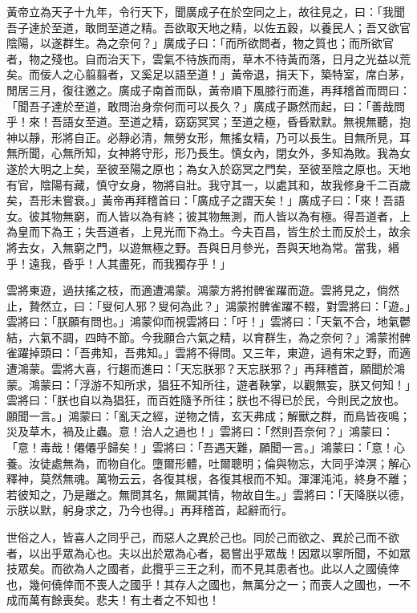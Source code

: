 \begin{pinyinscope}
黃帝立為天子十九年，令行天下，聞廣成子在於空同之上，故往見之，曰：「我聞吾子達於至道，敢問至道之精。吾欲取天地之精，以佐五穀，以養民人；吾又欲官陰陽，以遂群生。為之奈何？」廣成子曰：「而所欲問者，物之質也；而所欲官者，物之殘也。自而治天下，雲氣不待族而雨，草木不待黃而落，日月之光益以荒矣。而佞人之心翦翦者，又奚足以語至道！」黃帝退，捐天下，築特室，席白茅，閒居三月，復往邀之。廣成子南首而臥，黃帝順下風膝行而進，再拜稽首而問曰：「聞吾子達於至道，敢問治身奈何而可以長久？」廣成子蹶然而起，曰：「善哉問乎！來！吾語女至道。至道之精，窈窈冥冥；至道之極，昏昏默默。無視無聽，抱神以靜，形將自正。必靜必清，無勞女形，無搖女精，乃可以長生。目無所見，耳無所聞，心無所知，女神將守形，形乃長生。慎女內，閉女外，多知為敗。我為女遂於大明之上矣，至彼至陽之原也；為女入於窈冥之門矣，至彼至陰之原也。天地有官，陰陽有藏，慎守女身，物將自壯。我守其一，以處其和，故我修身千二百歲矣，吾形未嘗衰。」黃帝再拜稽首曰：「廣成子之謂天矣！」廣成子曰：「來！吾語女。彼其物無窮，而人皆以為有終；彼其物無測，而人皆以為有極。得吾道者，上為皇而下為王；失吾道者，上見光而下為土。今夫百昌，皆生於土而反於土，故余將去女，入無窮之門，以遊無極之野。吾與日月參光，吾與天地為常。當我，緡乎！遠我，昏乎！人其盡死，而我獨存乎！」

雲將東遊，過扶搖之枝，而適遭鴻蒙。鴻蒙方將拊髀雀躍而遊。雲將見之，倘然止，贄然立，曰：「叟何人邪？叟何為此？」鴻蒙拊髀雀躍不輟，對雲將曰：「遊。」雲將曰：「朕願有問也。」鴻蒙仰而視雲將曰：「吁！」雲將曰：「天氣不合，地氣鬱結，六氣不調，四時不節。今我願合六氣之精，以育群生，為之奈何？」鴻蒙拊髀雀躍掉頭曰：「吾弗知，吾弗知。」雲將不得問。又三年，東遊，過有宋之野，而適遭鴻蒙。雲將大喜，行趨而進曰：「天忘朕邪？天忘朕邪？」再拜稽首，願聞於鴻蒙。鴻蒙曰：「浮游不知所求，猖狂不知所往，遊者鞅掌，以觀無妄，朕又何知！」雲將曰：「朕也自以為猖狂，而百姓隨予所往；朕也不得已於民，今則民之放也。願聞一言。」鴻蒙曰：「亂天之經，逆物之情，玄天弗成；解獸之群，而鳥皆夜鳴；災及草木，禍及止蟲。意！治人之過也！」雲將曰：「然則吾奈何？」鴻蒙曰：「意！毒哉！僊僊乎歸矣！」雲將曰：「吾遇天難，願聞一言。」鴻蒙曰：「意！心養。汝徒處無為，而物自化。墮爾形體，吐爾聰明；倫與物忘，大同乎涬溟；解心釋神，莫然無魂。萬物云云，各復其根，各復其根而不知。渾渾沌沌，終身不離；若彼知之，乃是離之。無問其名，無闚其情，物故自生。」雲將曰：「天降朕以德，示朕以默，躬身求之，乃今也得。」再拜稽首，起辭而行。

世俗之人，皆喜人之同乎己，而惡人之異於己也。同於己而欲之、異於己而不欲者，以出乎眾為心也。夫以出於眾為心者，曷嘗出乎眾哉！因眾以寧所聞，不如眾技眾矣。而欲為人之國者，此攬乎三王之利，而不見其患者也。此以人之國僥倖也，幾何僥倖而不喪人之國乎！其存人之國也，無萬分之一；而喪人之國也，一不成而萬有餘喪矣。悲夫！有土者之不知也！


\end{pinyinscope}
